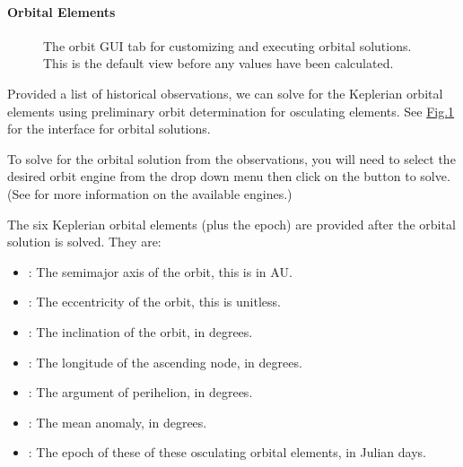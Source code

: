 \documentclass[letterpaper,11pt,english]{sphinxmanual}
\begin{document}
\paragraph{Orbital Elements}
\label{\detokenize{user/manual_mode:orbital-elements}}\label{\detokenize{user/manual_mode:user-manual-mode-procedure-orbital-elements}}
\begin{figure}[H]
\centering
\capstart

\noindent{}
\caption{The orbit GUI tab for customizing and executing orbital solutions.
This is the default view before any values have been calculated.}\label{\detokenize{user/manual_mode:id8}}\label{\detokenize{user/manual_mode:figure-manual-mode-gui-orbit}}\end{figure}

\sphinxAtStartPar
Provided a list of historical observations, we can solve for the Keplerian
orbital elements using preliminary orbit determination for osculating elements.
See \hyperref[\detokenize{user/manual_mode:figure-manual-mode-gui-orbit}]{Fig.\@ \ref{\detokenize{user/manual_mode:figure-manual-mode-gui-orbit}}} for the interface for orbital
solutions.

\sphinxAtStartPar
To solve for the orbital solution from the observations, you will need to
select the desired orbit engine from the drop down menu then click on the
 button to solve.
(See {\hyperref[\detokenize{technical/architecture/services_engines:technical-architecture-services-engines}]{}} for more information on
the available engines.)

\sphinxAtStartPar
The six Keplerian orbital elements (plus the epoch) are provided after the
orbital solution is solved. They are:
\begin{itemize}
\item {} 
\sphinxAtStartPar
{}: The semi\sphinxhyphen{}major axis of the orbit, this is in AU.

\item {} 
\sphinxAtStartPar
{}: The eccentricity of the orbit, this is unit\sphinxhyphen{}less.

\item {} 
\sphinxAtStartPar
{}: The inclination of the orbit, in degrees.

\item {} 
\sphinxAtStartPar
{}: The longitude of the ascending node, in degrees.

\item {} 
\sphinxAtStartPar
{}: The argument of perihelion, in degrees.

\item {} 
\sphinxAtStartPar
{}: The mean anomaly, in degrees.

\item {} 
\sphinxAtStartPar
{}: The epoch of these of these osculating orbital elements, in Julian days.

\end{itemize}
\end{document}
